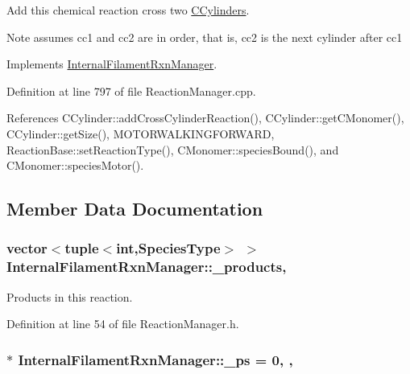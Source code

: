 Add this chemical reaction cross two \hyperlink{classCCylinder}{C\+Cylinders}. 

\begin{DoxyNote}{Note}
assumes cc1 and cc2 are in order, that is, cc2 is the next cylinder after cc1 
\end{DoxyNote}


Implements \hyperlink{classInternalFilamentRxnManager_ac8152bcd9f6aa5d69f85a98cff86d2b0}{Internal\+Filament\+Rxn\+Manager}.



Definition at line 797 of file Reaction\+Manager.\+cpp.



References C\+Cylinder\+::add\+Cross\+Cylinder\+Reaction(), C\+Cylinder\+::get\+C\+Monomer(), C\+Cylinder\+::get\+Size(), M\+O\+T\+O\+R\+W\+A\+L\+K\+I\+N\+G\+F\+O\+R\+W\+A\+R\+D, Reaction\+Base\+::set\+Reaction\+Type(), C\+Monomer\+::species\+Bound(), and C\+Monomer\+::species\+Motor().



\subsection{Member Data Documentation}
\hypertarget{classInternalFilamentRxnManager_afd213da1a3706e2e88962e5da886a5dc}{
\subsubsection[{\+\_\+products}]{\setlength{\rightskip}{0pt plus 5cm}vector$<$tuple$<$int,{\bf Species\+Type}$>$ $>$ Internal\+Filament\+Rxn\+Manager\+::\+\_\+products\hspace{0.3cm}{\ttfamily [protected]}, {\ttfamily [inherited]}}}\label{classInternalFilamentRxnManager_afd213da1a3706e2e88962e5da886a5dc}


Products in this reaction. 



Definition at line 54 of file Reaction\+Manager.\+h.

\hypertarget{classInternalFilamentRxnManager_a973ce9cc2aae811e6867afa46193c5f2}{
\subsubsection[{\+\_\+ps}]{ $\ast$ Internal\+Filament\+Rxn\+Manager\+::\+\_\+ps = 0\hspace{0.3cm}{\ttfamily [static]}, {\ttfamily [protected]}, {\ttfamily [inherited]}}}\label{classInternalFilamentRxnManager_a973ce9cc2aae811e6867afa46193c5f2}


